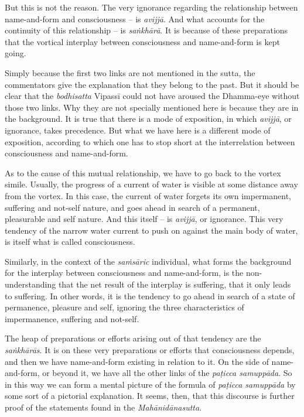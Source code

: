 But this is not the reason. The very ignorance regarding the relationship between name-and-form and consciousness -- is \emph{avijjā}. And what accounts for the continuity of this relationship -- is \emph{saṅkhārā}. It is because of these preparations that the vortical interplay between consciousness and name-and-form is kept going.

Simply because the first two links are not mentioned in the sutta, the commentators give the explanation that they belong to the past. But it should be clear that the \emph{bodhisatta} Vipassī could not have aroused the Dhamma-eye without those two links. Why they are not specially mentioned here is because they are in the background. It is true that there is a mode of exposition, in which \emph{avijjā}, or ignorance, takes precedence. But what we have here is a different mode of exposition, according to which one has to stop short at the interrelation between consciousness and name-and-form.

As to the cause of this mutual relationship, we have to go back to the vortex simile. Usually, the progress of a current of water is visible at some distance away from the vortex. In this case, the current of water forgets its own impermanent, suffering and not-self nature, and goes ahead in search of a permanent, pleasurable and self nature. And this itself -- is \emph{avijjā}, or ignorance. This very tendency of the narrow water current to push on against the main body of water, is itself what is called consciousness.

Similarly, in the context of the \emph{saṁsāric} individual, what forms the background for the interplay between consciousness and name-and-form, is the non-understanding that the net result of the interplay is suffering, that it only leads to suffering. In other words, it is the tendency to go ahead in search of a state of permanence, pleasure and self, ignoring the three characteristics of impermanence, suffering and not-self.

The heap of preparations or efforts arising out of that tendency are the \emph{saṅkhārās}. It is on these very preparations or efforts that consciousness depends, and then we have name-and-form existing in relation to it. On the side of name-and-form, or beyond it, we have all the other links of the \emph{paṭicca samuppāda}. So in this way we can form a mental picture of the formula of \emph{paṭicca samuppāda} by some sort of a pictorial explanation. It seems, then, that this discourse is further proof of the statements found in the \emph{Mahānidānasutta}.

